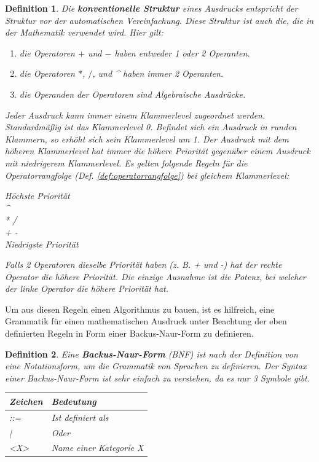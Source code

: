 \documentclass[11pt]{article}
\newtheorem{defin}{Definition}
\newcommand{\lab}[1]{(Def. \ref{#1})}
\begin{document}
\begin{defin}
  \label{def:konventionelle_struktur}
  Die \textbf{konventionelle Struktur} eines Ausdrucks entspricht der Struktur vor der automatischen Vereinfachung. 
  Diese Struktur ist auch die, die in der Mathematik verwendet wird. Hier gilt:

  \begin{enumerate}
    \item die Operatoren $+$ und $-$ haben entweder 1 oder 2 Operanten.
    \item die Operatoren $*$, $/$, und \textrm{\textasciicircum} haben immer 2 Operanten.
    \item die Operanden der Operatoren  sind Algebraische Ausdrücke.
  \end{enumerate}

  Jeder Ausdruck kann immer einem Klammerlevel zugeordnet werden. 
  Standardmäßig ist das Klammerlevel 0. Befindet sich ein Ausdruck in runden Klammern, 
  so erhöht sich sein Klammerlevel um 1. Der Ausdruck mit dem höheren Klammerlevel hat immer die höhere Priorität 
  gegenüber einem Ausdruck mit niedrigerem Klammerlevel.
  Es gelten folgende Regeln für die Operatorrangfolge \lab{def:operatorrangfolge} bei gleichem Klammerlevel:

  \begin{center}
    Höchste Priorität \\
    \textrm{\textasciicircum} \\
    \textrm{* /} \\
    \textrm{+ -} \\
    Niedrigste Priorität
  \end{center}

  Falls 2 Operatoren dieselbe Priorität haben (z. B. + und -) hat 
  der rechte Operator die höhere Priorität.
  Die einzige Ausnahme ist die Potenz, bei welcher der linke Operator
  die höhere Priorität hat.
\end{defin}

Um aus diesen Regeln einen Algorithmus zu bauen, ist es hilfreich, 
eine Grammatik für einen mathematischen Ausdruck unter Beachtung der eben definierten Regeln 
in Form einer Backus-Naur-Form zu definieren. 

\begin{defin}
  Eine \textbf{Backus-Naur-Form} (BNF) ist nach der Definition von \citeauthor{A_COMP} \cite{A_COMP}
  eine Notationsform, um die Grammatik von Sprachen zu definieren. 
  Der Syntax einer Backus-Naur-Form ist sehr einfach zu verstehen, da es nur 3 Symbole gibt.  

  \begin{table}[h]
  \begin{tabular}{|l|l|}
  \hline
    Zeichen     & Bedeutung               \\ \hline
    ::=         & Ist definiert als       \\ \hline
    |           & Oder                    \\ \hline
    <X>         & Name einer Kategorie X  \\ \hline
  \end{tabular}
  \end{table}
\end{defin}
\end{document}
